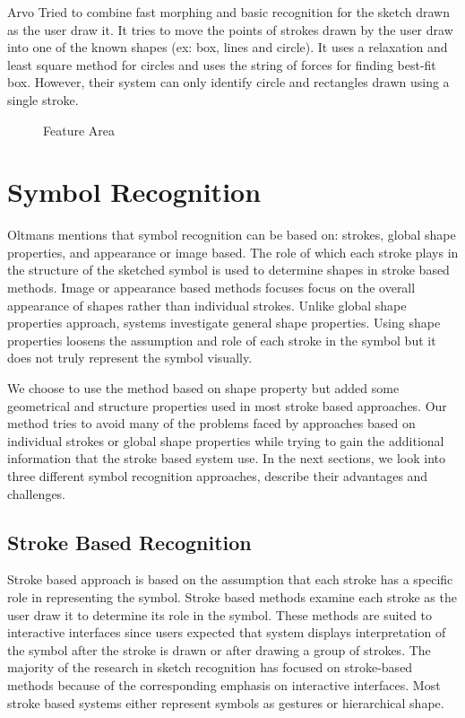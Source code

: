 Arvo \cite{Fluid25} Tried to combine fast morphing and basic recognition for the sketch drawn as the user draw it. It tries to move the points of strokes drawn by the user draw into one of the known shapes (ex: box, lines and circle). It uses a relaxation and least square method for circles and uses the string of forces for finding best-fit box. However, their system can only identify circle and rectangles drawn using a single stroke.  
\begin{figure}
	\centering
	\caption[Feature Area]{Feature Area \cite{meanshift10}}
	\label{fig:featurearearc}
\end{figure}

\section{Symbol Recognition}
\label{sec:symbolrecogntion}

 Oltmans\cite{Oltmans07} mentions that symbol recognition can be based on: strokes, global shape properties, and appearance or image based\cite{Oltmans07}. The role of which each stroke plays in the structure of the sketched symbol is used to determine shapes in stroke based methods.  Image or appearance based methods focuses focus on the overall appearance of shapes rather than individual strokes. Unlike global shape properties approach, systems investigate general shape properties. Using shape properties loosens the assumption and role of each stroke in the symbol but it does not truly represent the symbol visually. 
 
 We choose to use the method based on shape property but added some geometrical and structure properties used in most stroke based approaches. Our method tries to avoid many of the problems faced by approaches based on individual strokes or global shape properties while trying to gain the additional information that the stroke based system use. In the next sections, we look into three different symbol recognition approaches, describe their advantages and challenges.  
 
 
\subsection{Stroke Based Recognition}
\label{sec:StrokebasedRecognition}
Stroke based approach is based on the assumption that each stroke has a specific role in representing the symbol. Stroke based methods examine each stroke as the user draw it to determine its role in the symbol. These methods are suited to interactive interfaces since users expected that system displays interpretation of the symbol after the stroke is drawn or after drawing a group of strokes. The majority of the research in sketch recognition has focused on stroke-based methods because of the corresponding emphasis on interactive interfaces. Most stroke based systems either represent symbols as gestures or hierarchical shape. 

